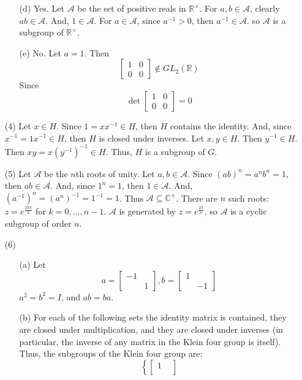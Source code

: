 \begin{itemize}
\begin{itemize}
\item[(d)]Yes. Let $\mathcal{A}$ be the set of positive reals in $\mathbb{R}^\times$. For $a, b \in \mathcal{A}$, clearly $ab \in \mathcal{A}$. And, $1 \in \mathcal{A}$. For $a \in \mathcal{A}$, since $a^{-1} > 0$, then $a^{-1} \in \mathcal{A}$. so $\mathcal{A}$ is a subgroup of $\mathbb{R}^\times$.
\item[(e)] No. Let $a = 1$. Then
$$\begin{bmatrix}
1 & 0 \\
0 & 0
\end{bmatrix} \not \in GL_2(\mathbb{R})$$
Since
$$\det\begin{bmatrix}
1 & 0 \\
0 & 0
\end{bmatrix} = 0$$
\end{itemize}
\item[(4)]
Let $x \in H$. Since $1 = xx^{-1} \in H$, then $H$ contains the identity. And, since $x^{-1} = 1x^{-1} \in H$, then $H$ is closed under inverses. Let $x, y \in H$. Then $y^{-1} \in H$. Then $xy = x(y^{-1})^{-1} \in H$. Thus, $H$ is a subgroup of $G$.
\item[(5)]
Let $\mathcal{A}$ be the $n$th roots of unity. Let $a, b \in \mathcal{A}$. Since $(ab)^n = a^nb^n = 1$, then $ab \in \mathcal{A}$. And, since $1^n = 1$, then $1 \in \mathcal{A}$. And, $(a^{-1})^n = (a^n)^{-1} = 1^{-1} = 1$. Thus $\mathcal{A} \subseteq \mathbb{C}^\times$. There are $n$ such roots: $z = e^{\frac{2\pi k}{n}}$ for $k = 0, ..., n - 1$. $\mathcal{A}$ is generated by $z = e^{\frac{2\pi}{n}}$, so $\mathcal{A}$ is a cyclic subgroup of order $n$.
\item[(6)]
\begin{itemize}
\item[(a)]
Let
$$a = \begin{bmatrix}
-1 & \\
& 1
\end{bmatrix}, b = \begin{bmatrix}
1 & \\
& -1
\end{bmatrix}$$
$a^2 = b^2 = I$, and $ab = ba$.
\item[(b)]
For each of the following sets the identity matrix is contained, they are closed under multiplication, and they are closed under inverses (in particular, the inverse of any matrix in the Klein four group is itself). Thus, the subgroups of the Klein four group are:
$$\left\lbrace \begin{bmatrix}
1 & \\

\end{bmatrix}$$
\end{itemize}
\end{itemize}

